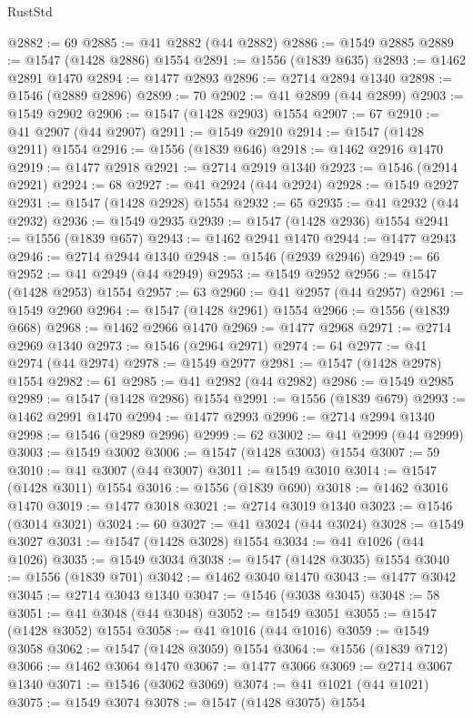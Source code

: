 \begin{lexlean}{RustStd}
\begin{coremodule}
{\begin{coremodule}
{{{{{{{{{{{{{{{{{{{{{{{{{{{{{{@2882 := 69
@2885 := @41 @2882 (@44 @2882)
@2886 := @1549 @2885
@2889 := @1547 (@1428 @2886) @1554
@2891 := @1556 (@1839 @635)
@2893 := @1462 @2891 @1470
@2894 := @1477 @2893
@2896 := @2714 @2894 @1340
@2898 := @1546 (@2889 @2896)
@2899 := 70
@2902 := @41 @2899 (@44 @2899)
@2903 := @1549 @2902
@2906 := @1547 (@1428 @2903) @1554
@2907 := 67
@2910 := @41 @2907 (@44 @2907)
@2911 := @1549 @2910
@2914 := @1547 (@1428 @2911) @1554
@2916 := @1556 (@1839 @646)
@2918 := @1462 @2916 @1470
@2919 := @1477 @2918
@2921 := @2714 @2919 @1340
@2923 := @1546 (@2914 @2921)
@2924 := 68
@2927 := @41 @2924 (@44 @2924)
@2928 := @1549 @2927
@2931 := @1547 (@1428 @2928) @1554
@2932 := 65
@2935 := @41 @2932 (@44 @2932)
@2936 := @1549 @2935
@2939 := @1547 (@1428 @2936) @1554
@2941 := @1556 (@1839 @657)
@2943 := @1462 @2941 @1470
@2944 := @1477 @2943
@2946 := @2714 @2944 @1340
@2948 := @1546 (@2939 @2946)
@2949 := 66
@2952 := @41 @2949 (@44 @2949)
@2953 := @1549 @2952
@2956 := @1547 (@1428 @2953) @1554
@2957 := 63
@2960 := @41 @2957 (@44 @2957)
@2961 := @1549 @2960
@2964 := @1547 (@1428 @2961) @1554
@2966 := @1556 (@1839 @668)
@2968 := @1462 @2966 @1470
@2969 := @1477 @2968
@2971 := @2714 @2969 @1340
@2973 := @1546 (@2964 @2971)
@2974 := 64
@2977 := @41 @2974 (@44 @2974)
@2978 := @1549 @2977
@2981 := @1547 (@1428 @2978) @1554
@2982 := 61
@2985 := @41 @2982 (@44 @2982)
@2986 := @1549 @2985
@2989 := @1547 (@1428 @2986) @1554
@2991 := @1556 (@1839 @679)
@2993 := @1462 @2991 @1470
@2994 := @1477 @2993
@2996 := @2714 @2994 @1340
@2998 := @1546 (@2989 @2996)
@2999 := 62
@3002 := @41 @2999 (@44 @2999)
@3003 := @1549 @3002
@3006 := @1547 (@1428 @3003) @1554
@3007 := 59
@3010 := @41 @3007 (@44 @3007)
@3011 := @1549 @3010
@3014 := @1547 (@1428 @3011) @1554
@3016 := @1556 (@1839 @690)
@3018 := @1462 @3016 @1470
@3019 := @1477 @3018
@3021 := @2714 @3019 @1340
@3023 := @1546 (@3014 @3021)
@3024 := 60
@3027 := @41 @3024 (@44 @3024)
@3028 := @1549 @3027
@3031 := @1547 (@1428 @3028) @1554
@3034 := @41 @1026 (@44 @1026)
@3035 := @1549 @3034
@3038 := @1547 (@1428 @3035) @1554
@3040 := @1556 (@1839 @701)
@3042 := @1462 @3040 @1470
@3043 := @1477 @3042
@3045 := @2714 @3043 @1340
@3047 := @1546 (@3038 @3045)
@3048 := 58
@3051 := @41 @3048 (@44 @3048)
@3052 := @1549 @3051
@3055 := @1547 (@1428 @3052) @1554
@3058 := @41 @1016 (@44 @1016)
@3059 := @1549 @3058
@3062 := @1547 (@1428 @3059) @1554
@3064 := @1556 (@1839 @712)
@3066 := @1462 @3064 @1470
@3067 := @1477 @3066
@3069 := @2714 @3067 @1340
@3071 := @1546 (@3062 @3069)
@3074 := @41 @1021 (@44 @1021)
@3075 := @1549 @3074
@3078 := @1547 (@1428 @3075) @1554
}}}}}}}}}}}}}}}}}}}}}}}}}}}}}}
\end{coremodule}}
\end{coremodule}
\end{lexlean}
